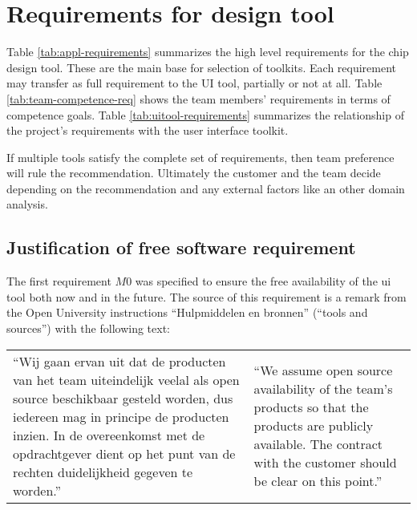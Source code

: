 \section{Requirements for design tool}

Table \ref{tab:appl-requirements} summarizes the high level requirements for
the chip design tool. These are the main base for selection of toolkits. Each 
requirement may transfer as full requirement to the UI tool, partially or 
not at all. 
Table \ref{tab:team-competence-req} shows the team members' requirements in 
terms of competence goals. 
Table \ref{tab:uitool-requirements} summarizes the relationship 
of the project's requirements with the user interface toolkit.

If multiple tools satisfy the complete set of requirements, then
team preference will rule the recommendation. Ultimately the customer
and the team decide depending on the recommendation and any external factors
like an other domain analysis.

\subsection{Justification of free software requirement}

The first requirement $M0$ was specified to ensure the free availability of the
ui tool both now and in the future. The source of
this requirement is a remark from the Open University instructions
``Hulpmiddelen en bronnen'' (``tools and sources'') with the following text:

\vspace{1em}

\begin{tabular}[t]{ll}
\begin{minipage}{.45\textwidth}

	``Wij gaan ervan uit dat de producten van het team uiteindelijk veelal als
	open source beschikbaar gesteld worden, dus iedereen mag in principe de
	producten inzien. In de overeenkomst met de opdrachtgever dient op het punt
	van de rechten duidelijkheid gegeven te worden.''

\end{minipage}

&

\begin{minipage}{.45\textwidth}

	``We assume open source availability of the team's products so that the
	products are publicly available. The contract with the customer should be
	clear on this point.''

\end{minipage}

\end{tabular}

